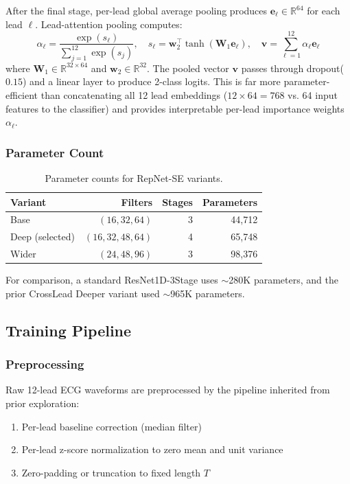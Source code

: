 \documentclass[11pt,a4paper]{article}
\begin{document}
After the final stage, per-lead global average pooling produces $\mathbf{e}_\ell \in \mathbb{R}^{64}$ for each lead $\ell$. Lead-attention pooling computes:
\begin{equation}
\alpha_\ell = \frac{\exp(s_\ell)}{\sum_{j=1}^{12} \exp(s_j)}, \quad
s_\ell = \mathbf{w}_2^\top \tanh(\mathbf{W}_1 \mathbf{e}_\ell), \quad
\mathbf{v} = \sum_{\ell=1}^{12} \alpha_\ell \mathbf{e}_\ell
\end{equation}
where $\mathbf{W}_1 \in \mathbb{R}^{32 \times 64}$ and $\mathbf{w}_2 \in \mathbb{R}^{32}$. The pooled vector $\mathbf{v}$ passes through dropout($0.15$) and a linear layer to produce 2-class logits. This is far more parameter-efficient than concatenating all 12 lead embeddings ($12 \times 64 = 768$ vs. 64 input features to the classifier) and provides interpretable per-lead importance weights $\alpha_\ell$.

\subsubsection{Parameter Count}

\begin{table}[H]
\centering
\caption{Parameter counts for RepNet-SE variants.}
\label{tab:params}
\begin{tabular}{lrrr}
\toprule
\textbf{Variant} & \textbf{Filters} & \textbf{Stages} & \textbf{Parameters} \\
\midrule
Base & $(16, 32, 64)$ & 3 & 44,712 \\
Deep (selected) & $(16, 32, 48, 64)$ & 4 & 65,748 \\
Wider & $(24, 48, 96)$ & 3 & 98,376 \\
\bottomrule
\end{tabular}
\end{table}

For comparison, a standard ResNet1D-3Stage uses $\sim$280K parameters, and the prior CrossLead Deeper variant used $\sim$965K parameters.


\subsection{Training Pipeline}
\label{sec:training}

\subsubsection{Preprocessing}

Raw 12-lead ECG waveforms are preprocessed by the pipeline inherited from prior exploration:
\begin{enumerate}[nosep]
  \item Per-lead baseline correction (median filter)
  \item Per-lead z-score normalization to zero mean and unit variance
  \item Zero-padding or truncation to fixed length $T$
\end{enumerate}
\end{document}
